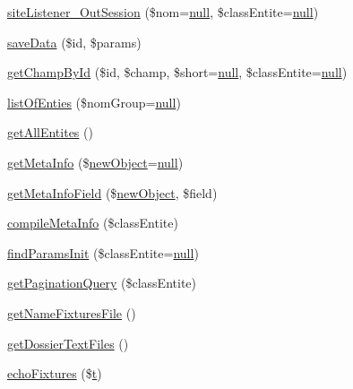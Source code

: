 \begin{DoxyCompactItemize}
\item 
\hyperlink{classentities_generic_af3547ef91ea0dff8f53c640983ab83e6}{site\+Listener\+\_\+\+Out\+Session} (\$nom=\hyperlink{validate_8js_afb8e110345c45e74478894341ab6b28e}{null}, \$class\+Entite=\hyperlink{validate_8js_afb8e110345c45e74478894341ab6b28e}{null})
\item 
\hyperlink{classentities_generic_a6548d4200add9bdc4015f16e7fdf123b}{save\+Data} (\$id, \$params)
\item 
\hyperlink{classentities_generic_a39714409682997e470a505ea29f39dcd}{get\+Champ\+By\+Id} (\$id, \$champ, \$short=\hyperlink{validate_8js_afb8e110345c45e74478894341ab6b28e}{null}, \$class\+Entite=\hyperlink{validate_8js_afb8e110345c45e74478894341ab6b28e}{null})
\item 
\hyperlink{classentities_generic_a42f69bdfe97603c31799f9019c8a784f}{list\+Of\+Enties} (\$nom\+Group=\hyperlink{validate_8js_afb8e110345c45e74478894341ab6b28e}{null})
\item 
\hyperlink{classentities_generic_a4ffb2c52374edc5f11f188f0b3685c19}{get\+All\+Entites} ()
\item 
\hyperlink{classentities_generic_a9a9328d7f68e7cc0def6a7ee7a208b5f}{get\+Meta\+Info} (\$\hyperlink{classentities_generic_a9faea81ec9af97ef036f3fe13586efa3}{new\+Object}=\hyperlink{validate_8js_afb8e110345c45e74478894341ab6b28e}{null})
\item 
\hyperlink{classentities_generic_a3ad3d99cc9f942a1930579a646990dc4}{get\+Meta\+Info\+Field} (\$\hyperlink{classentities_generic_a9faea81ec9af97ef036f3fe13586efa3}{new\+Object}, \$field)
\item 
\hyperlink{classentities_generic_accdadc0dce1dbc20f3cdf95dfa52993c}{compile\+Meta\+Info} (\$class\+Entite)
\item 
\hyperlink{classentities_generic_a215c6ce19abbadb8539ff0a95aadb5e6}{find\+Params\+Init} (\$class\+Entite=\hyperlink{validate_8js_afb8e110345c45e74478894341ab6b28e}{null})
\item 
\hyperlink{classentities_generic_a1ab7277c918ba61b3315d4c528e19fbf}{get\+Pagination\+Query} (\$class\+Entite)
\item 
\hyperlink{classentities_generic_afcb9fd05c8671f80ec95064814a103de}{get\+Name\+Fixtures\+File} ()
\item 
\hyperlink{classentities_generic_a635452a8d80c4b178aa812f1eaaed94f}{get\+Dossier\+Text\+Files} ()
\item 
\hyperlink{classentities_generic_a48ab21d1702b8187124d2f695ad30e36}{echo\+Fixtures} (\$\hyperlink{jquery_8knob_8js_aa09e7cf223942a40813c00a3897b7c48}{t})
\end{DoxyCompactItemize}
